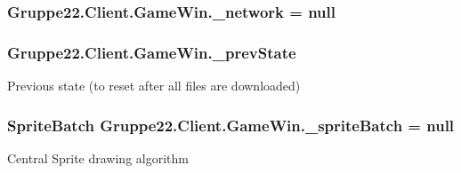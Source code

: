 \hypertarget{class_gruppe22_1_1_client_1_1_game_win_a69d302e4a8d7839adbad2a3c9aa4baf9}{
\subsubsection[{\-\_\-network}]{ Gruppe22.\-Client.\-Game\-Win.\-\_\-network = null\hspace{0.3cm}{\ttfamily [protected]}}}\label{class_gruppe22_1_1_client_1_1_game_win_a69d302e4a8d7839adbad2a3c9aa4baf9}
\hypertarget{class_gruppe22_1_1_client_1_1_game_win_a5ee0952fc213d5c3ae63698876a30ace}{
\subsubsection[{\-\_\-prev\-State}]{ Gruppe22.\-Client.\-Game\-Win.\-\_\-prev\-State\hspace{0.3cm}{\ttfamily [protected]}}}\label{class_gruppe22_1_1_client_1_1_game_win_a5ee0952fc213d5c3ae63698876a30ace}


Previous state (to reset after all files are downloaded) 

\hypertarget{class_gruppe22_1_1_client_1_1_game_win_af52be4e292a7ea1bf8b6f987ec31c52f}{
\subsubsection[{\-\_\-sprite\-Batch}]{\setlength{\rightskip}{0pt plus 5cm}Sprite\-Batch Gruppe22.\-Client.\-Game\-Win.\-\_\-sprite\-Batch = null\hspace{0.3cm}{\ttfamily [protected]}}}\label{class_gruppe22_1_1_client_1_1_game_win_af52be4e292a7ea1bf8b6f987ec31c52f}


Central Sprite drawing algorithm 

